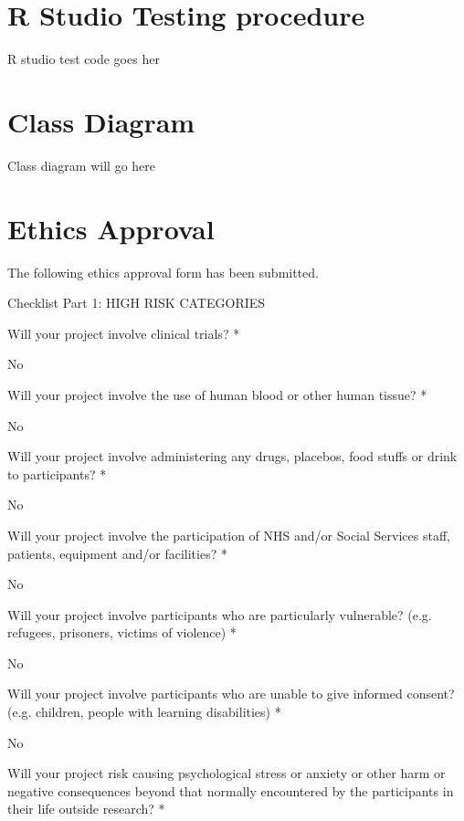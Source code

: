 \documentclass[lettersize,journal]{IEEEtran}
\begin{document}
\appendices
{\section{R Studio Testing procedure}
R studio test code goes her
\section{Class Diagram}
Class diagram will go here
\section{Ethics Approval}
The following ethics approval form has been submitted.

Checklist Part 1: HIGH RISK CATEGORIES

Will your project involve clinical trials? *

No

Will your project involve the use of human blood or other human tissue? *

No

Will your project involve administering any drugs, placebos, food stuffs or drink to participants? *

No

Will your project involve the participation of NHS and/or Social Services staff, patients, equipment and/or facilities? *

No

Will your project involve participants who are particularly vulnerable? (e.g. refugees, prisoners, victims of violence) *

No

Will your project involve participants who are unable to give informed consent? (e.g. children, people with learning disabilities) *

No

Will your project risk causing psychological stress or anxiety or other harm or negative consequences beyond that normally encountered by the participants in their life outside research? *

}
\end{document}
